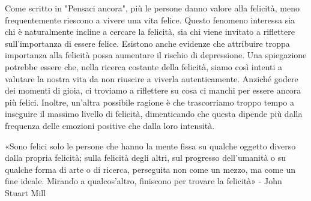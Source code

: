 \documentclass[12pt]{book} %
\begin{document}
Come scritto in "Pensaci ancora", più le persone danno valore alla felicità, meno frequentemente riescono a vivere una vita felice. Questo fenomeno interessa sia chi è naturalmente incline a cercare la felicità, sia chi viene invitato a riflettere sull'importanza di essere felice. Esistono anche evidenze che attribuire troppa importanza alla felicità possa aumentare il rischio di depressione. Una spiegazione potrebbe essere che, nella ricerca costante della felicità, siamo così intenti a valutare la nostra vita da non riuscire a viverla autenticamente. Anziché godere dei momenti di gioia, ci troviamo a riflettere su cosa ci manchi per essere ancora più felici. Inoltre, un’altra possibile ragione è che trascorriamo troppo tempo a inseguire il massimo livello di felicità, dimenticando che questa dipende più dalla frequenza delle emozioni positive che dalla loro intensità.

«Sono felici solo le persone che hanno la mente fissa su qualche oggetto diverso dalla propria felicità; sulla felicità degli altri, sul progresso dell’umanità o su qualche forma di arte o di ricerca, perseguita non come un mezzo, ma come un fine ideale. Mirando a qualcos’altro, finiscono per trovare la felicità» - John Stuart Mill
\end{document}
